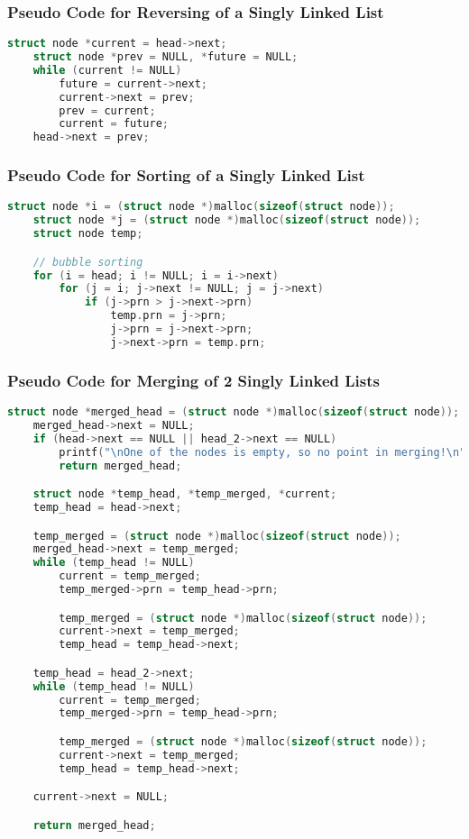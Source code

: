 \documentclass[11pt]{article}
\begin{document}
\subsubsection{Pseudo Code for Reversing of a Singly Linked List}
\begin{lstlisting}[language=C]
    struct node *current = head->next;
    struct node *prev = NULL, *future = NULL;
    while (current != NULL)
        future = current->next;
        current->next = prev;
        prev = current;
        current = future;
    head->next = prev;
\end{lstlisting}
\subsubsection{Pseudo Code for Sorting of a Singly Linked List}
\begin{lstlisting}[language=C]
	struct node *i = (struct node *)malloc(sizeof(struct node));
    struct node *j = (struct node *)malloc(sizeof(struct node));
    struct node temp;

    // bubble sorting
    for (i = head; i != NULL; i = i->next)
        for (j = i; j->next != NULL; j = j->next)
            if (j->prn > j->next->prn)
                temp.prn = j->prn;
                j->prn = j->next->prn;
                j->next->prn = temp.prn;
\end{lstlisting}
\subsubsection{Pseudo Code for Merging of 2 Singly Linked Lists}
\begin{lstlisting}[language=C]
	struct node *merged_head = (struct node *)malloc(sizeof(struct node));
    merged_head->next = NULL;
    if (head->next == NULL || head_2->next == NULL)
        printf("\nOne of the nodes is empty, so no point in merging!\n");
        return merged_head;

    struct node *temp_head, *temp_merged, *current;
    temp_head = head->next;

    temp_merged = (struct node *)malloc(sizeof(struct node));
    merged_head->next = temp_merged;
    while (temp_head != NULL)
        current = temp_merged;
        temp_merged->prn = temp_head->prn;

        temp_merged = (struct node *)malloc(sizeof(struct node));
        current->next = temp_merged;
        temp_head = temp_head->next;

    temp_head = head_2->next;
    while (temp_head != NULL)
        current = temp_merged;
        temp_merged->prn = temp_head->prn;

        temp_merged = (struct node *)malloc(sizeof(struct node));
        current->next = temp_merged;
        temp_head = temp_head->next;

    current->next = NULL;

    return merged_head;
\end{lstlisting}
\end{document}

